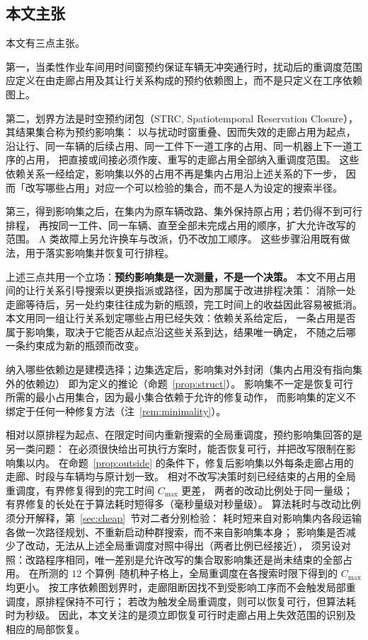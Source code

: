 \documentclass[manuscript,screen,review]{acmart}
\providecommand{\STRC}{\textsc{STRC}}
\newcommand{\EfiveCells}{12}        %
\begin{document}
\subsection{本文主张}

本文有三点主张。

第一，当柔性作业车间用时间窗预约保证车辆无冲突通行时，扰动后的重调度范围应定义在由走廊占用及其让行关系构成的预约依赖图上，而不是只定义在工序依赖图上。

第二，划界方法是时空预约闭包（\STRC, Spatiotemporal Reservation Closure），其结果集合称为预约影响集：
以与扰动时窗重叠、因而失效的走廊占用为起点，沿让行、同一车辆的后续占用、同一工件下一道工序的占用、同一机器上下一道工序的占用，
把直接或间接必须作废、重写的走廊占用全部纳入重调度范围。
这些依赖关系一经给定，影响集以外的占用不再是集内占用沿上述关系的下一步，
因而「改写哪些占用」对应一个可以检验的集合，而不是人为设定的搜索半径。

第三，得到影响集之后，在集内为原车辆改路、集外保持原占用；若仍得不到可行排程，
再按同一工件、同一车辆、直至全部未完成占用的顺序，扩大允许改写的范围。
A 类故障上另允许换车与改派，仍不改加工顺序。
这些步骤沿用既有做法，用于落实影响集并恢复可行排程。

上述三点共用一个立场：\textbf{预约影响集是一次测量，不是一个决策。}
本文不用占用间的让行关系引导搜索以更换指派或路径，因为那属于改进排程决策：
消除一处走廊等待后，另一处约束往往成为新的瓶颈，完工时间上的收益因此容易被抵消。
本文用同一组让行关系划定哪些占用已经失效：依赖关系给定后，
一条占用是否属于影响集，取决于它能否从起点沿这些关系到达，结果唯一确定，
不随之后哪一条约束成为新的瓶颈而改变。

纳入哪些依赖边是建模选择；边集选定后，影响集对外封闭（集内占用没有指向集外的依赖边）
即为定义的推论（命题~\ref{prop:struct}）。
影响集不一定是恢复可行所需的最小占用集合，因为最小集合依赖于允许的修复动作，
而影响集的定义不绑定于任何一种修复方法（注~\ref{rem:minimality}）。

相对以原排程为起点、在限定时间内重新搜索的全局重调度，预约影响集回答的是另一类问题：
在必须很快给出可执行方案时，能否恢复可行，并把改写限制在影响集以内。
在命题~\ref{prop:outside} 的条件下，修复后影响集以外每条走廊占用的走廊、时段与车辆均与原计划一致。
相对不改写决策时刻已经结束的占用的全局重调度，有界修复得到的完工时间 \(C_{\max}\) 更差，
两者的改动比例处于同一量级；有界修复的长处在于算法耗时短得多（毫秒量级对秒量级）。
算法耗时与改动比例须分开解释，第~\ref{sec:cheap}~节对二者分别检验：
耗时短来自对影响集内各段运输各做一次路径规划、不重新启动种群搜索，而不来自影响集本身；
影响集是否减少了改动，无法从上述全局重调度对照中得出（两者比例已经接近），
须另设对照：改路程序相同，唯一差别是允许改写的集合取影响集还是尚未结束的全部占用。
在所测的 \(\EfiveCells\) 个算例--随机种子格上，全局重调度在各搜索时限下得到的 \(C_{\max}\) 均更小。
按工序依赖图划界时，走廊阻断因找不到受影响工序而不会触发局部重调度，原排程保持不可行；
若改为触发全局重调度，则可以恢复可行，但算法耗时为秒级。
因此，本文关注的是须立即恢复可行时走廊占用上失效范围的识别及相应的局部恢复。
\end{document}
